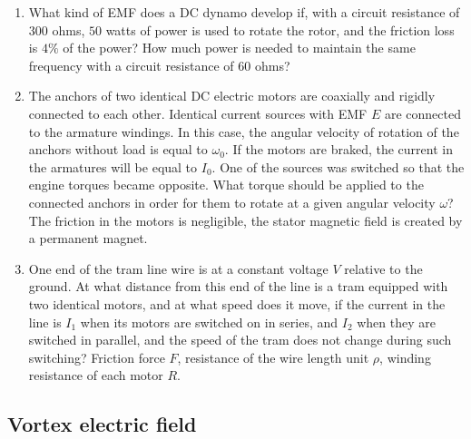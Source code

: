 \documentclass{article}
\begin{document}
\begin{enumerate}[label=11.1.\arabic*]
\item What kind of EMF does a DC dynamo develop if, with a circuit resistance of $300$ ohms, $50$ watts of power is used to rotate the rotor, and the friction loss is $4 \%$ of the power? How much power is needed to maintain the same frequency with a circuit resistance of $60$ ohms?

\item The anchors of two identical DC electric motors are coaxially and rigidly connected to each other. Identical current sources with EMF $E$ are connected to the armature windings. In this case, the angular velocity of rotation of the anchors without load is equal to $\omega_0$. If the motors are braked, the current in the armatures will be equal to $I_0$. One of the sources was switched so that the engine torques became opposite. What torque should be applied to the connected anchors in order for them to rotate at a given angular velocity $\omega$? The friction in the motors is negligible, the stator magnetic field is created by a permanent magnet.

\item One end of the tram line wire is at a constant voltage $V$ relative to the ground. At what distance from this end of the line is a tram equipped with two identical motors, and at what speed does it move, if the current in the line is $I_1$ when its motors are switched on in series, and $I_2$ when they are switched in parallel, and the speed of the tram does not change during such switching? Friction force $F$, resistance of the wire length unit $\rho$, winding resistance of each motor $R$.


\end{enumerate}



\subsection{Vortex electric field}
\end{document}
